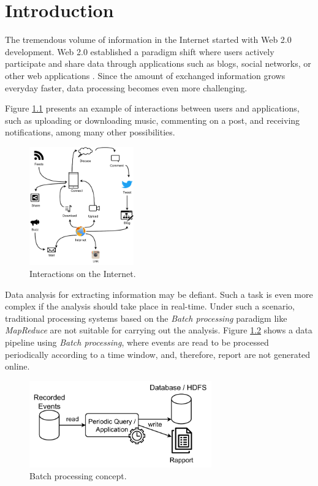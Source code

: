 %
\chapter{Introduction}
\label{intro}
The tremendous volume of information in the Internet started with Web 2.0 development. Web 2.0 established a paradigm shift where users actively participate and share data through applications such as blogs, social networks, or other web applications \citep{NEWMAN2016591}. %
Since the amount of exchanged information grows everyday faster, data processing becomes even more challenging.

Figure \ref{fig:web} presents an example of interactions between users and applications, such as uploading or downloading music, commenting on a post, and receiving notifications, among many other possibilities.

\begin{figure}[!ht]
    \centering
    \includegraphics[width=0.4\textwidth]{figures/concepts/Web.pdf}
    \caption{Interactions on the Internet.}
    \label{fig:web}
\end{figure}

Data analysis for extracting information may be defiant. Such a task is even more complex if the analysis should take place in real-time. Under such a scenario, traditional processing systems based on the \textit{Batch processing} paradigm like \textit{MapReduce} \citep{DeanG08, CasadoY15} are not suitable for carrying out the analysis. Figure \ref{fig:batch-processing} shows a data pipeline using \textit{Batch processing}, where events are read to be processed periodically according to a time window, and, therefore, report are not generated online.

\begin{figure}[!ht]
    \centering
    \includegraphics[width=0.7\textwidth]{figures/concepts/BatchProcessing.pdf}
    \caption{Batch processing concept.}
    \label{fig:batch-processing}
\end{figure}


